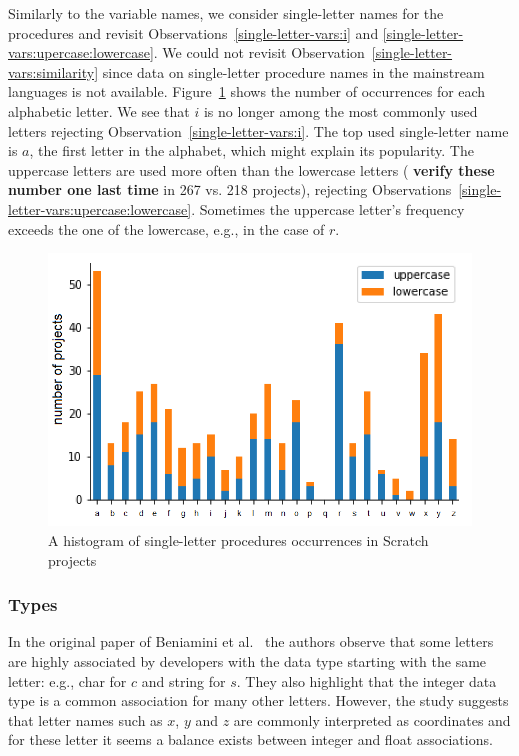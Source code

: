 \documentclass[conference]{IEEEtran}
\newcommand{\todo}[1]{ \textbf{#1} }
\begin{document}
Similarly to the variable names, we consider single-letter names for the procedures and revisit Observations~\ref{single-letter-vars:i} and \ref{single-letter-vars:upercase:lowercase}. 
We could not revisit Observation~\ref{single-letter-vars:similarity} since data on single-letter procedure names in the mainstream languages is not available.
Figure~\ref{fig:one_letter_occurrence_procedures} shows the number of occurrences for each alphabetic letter. 
We see that $i$ is no longer among the most commonly used letters rejecting Observation~\ref{single-letter-vars:i}.
The top used single-letter name is $a$, the first letter in the alphabet, which might explain its popularity.
The uppercase letters are used more often than the lowercase letters (\todo{verify these number one last time}in 267 vs. 218 projects), rejecting Observations~\ref{single-letter-vars:upercase:lowercase}.
Sometimes the uppercase letter's frequency exceeds the one of the lowercase, e.g., in the case of $r$. 

\begin{figure}
	\begin{center}
		\includegraphics[width=\columnwidth]{fig/project/single_letter_proc}
		\caption{A histogram of single-letter procedures occurrences in Scratch projects}
		\label{fig:one_letter_occurrence_procedures}
	\end{center}
\end{figure} 

\subsubsection{Types}
\label{res:types}

In the original paper of Beniamini et al.~\cite{Beniamini} the authors observe that some letters are highly associated by developers with the data type starting with the same letter: e.g., char for $c$ and string for $s$. They also highlight that the integer data type is a common association for many other letters. However, the study suggests that letter names such as $x$, $y$ and $z$ are commonly interpreted as coordinates and for these letter it seems a balance exists between integer and float associations. 
\end{document}
